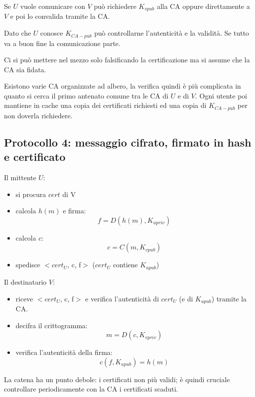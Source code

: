 Se $U$ vuole comunicare con $V$ può richiedere $K_{vpub}$ alla CA oppure direttamente a $V$ e poi lo convalida tramite la CA.

Dato che $U$ conosce $K_{CA-pub}$ può controllarne l'autenticità e la validità.
Se tutto va a buon fine la comunicazione parte.

Ci si può mettere nel mezzo solo falsificando la certificazione ma si assume che la CA sia fidata.

Esistono varie CA organizzate ad albero, la verifica quindi è più complicata in quanto si cerca il primo antenato comune tra le CA di $U$ e di $V$. Ogni utente poi mantiene in cache una copia dei certificati richiesti ed una copia di $K_{CA-pub}$ per non doverla richiedere.

\subsection{Protocollo 4: messaggio cifrato, firmato in hash e certificato}
Il mittente $U$:
\begin{itemize}
    \item si procura $cert$ di V

    \item calcola $h(m)$ e firma:
    $$ f = D(h(m),K_{upriv}) $$

    \item calcola $c$:
    $$ c = C(m, K_{vpub}) $$

    \item spedisce $<cert_U$, c, f$>$ ($cert_U$ contiene $K_{upub}$)
\end{itemize}

Il destinatario $V$:
\begin{itemize}
    \item riceve $<cert_U$, c, f$>$ e verifica l'autenticità di $cert_U$ (e di $K_{upub}$) tramite la CA.

    \item decifra il crittogramma:
    $$ m=D(c, K_{vpriv}) $$

    \item verifica l'autenticità della firma:
    $$ c(f, K_{upub}) = h(m) $$
\end{itemize}

La catena ha un punto debole: i certificati non più validi; è quindi cruciale controllare periodicamente con la CA i certificati scaduti.